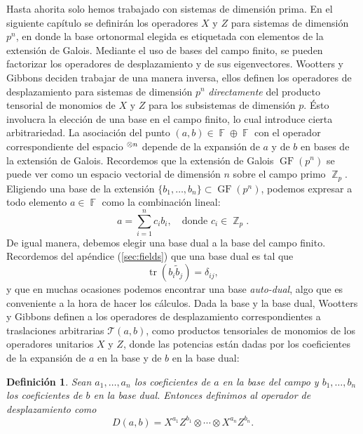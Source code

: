 \documentclass[a4paper]{report}
\DeclareMathOperator{\Z}{\mathbb{Z}}
\DeclareMathOperator{\F}{\mathbb{F}}
\let\H\relax
\DeclareMathOperator{\H}{\mathcal H}
\DeclareMathOperator{\tr}{tr}
\DeclareMathOperator{\GF}{GF}
\newtheorem{definition}{Definición}
\begin{document}
  Hasta ahorita solo hemos trabajado con sistemas de
  dimensión prima. En el siguiente capítulo se definirán los
  operadores $X$ y $Z$ para sistemas de dimensión $p^{n}$,
  en donde la base ortonormal elegida es etiquetada con
  elementos de la extensión de Galois. Mediante el uso de
  bases del campo finito, se pueden factorizar los
  operadores de desplazamiento y de sus eigenvectores.
  Wootters y Gibbons deciden trabajar de una manera inversa,
  ellos definen los operadores de desplazamiento para
  sistemas de dimensión $p^{n}$ \textit{directamente} del
  producto tensorial de monomios de $X$ y $Z$ para los
  subsistemas de dimensión $p$. Ésto involucra la elección
  de una base en el campo finito, lo cual introduce cierta
  arbitrariedad. La asociación del punto $(a,b) \in \F
  \oplus \F$ con el operador correspondiente del espacio
  $\H^{\otimes n}$ depende de la expansión de $a$ y de $b$
  en bases de la extensión de Galois.  Recordemos que la
  extensión de Galois $\GF\left(p^{n}\right)$ se puede ver
  como un espacio vectorial de dimensión $n$ sobre el campo
  primo $\Z_p$.  Eligiendo una base de la extensión
  $\{b_1,\ldots,b_n\} \subset \GF\left(p^{n}\right)$,
  podemos expresar a todo elemento $a \in \F$ como la
  combinación lineal:
  \[
    a = \sum_{i=1}^{n} c_i b_i,
    \quad
    \text{donde } c_i \in \Z_p.
  \] 
  De igual manera, debemos elegir una base dual a la base
  del campo finito. Recordemos del apéndice
  (\ref{sec:fields}) que una base dual es tal que
  \[
    \tr(b_i \tilde b_j) = \delta_{ij},
  \] 
  y que en muchas ocasiones podemos encontrar una base
  \textit{auto-dual}, algo que es conveniente a la hora de
  hacer los cálculos. Dada la base y la base dual, Wootters
  y Gibbons definen a los operadores de desplazamiento
  correspondientes a traslaciones arbitrarias $\mathcal
  T(a,b)$, como productos tensoriales de monomios de los
  operadores unitarios $X$ y $Z$, donde las potencias están
  dadas por los coeficientes de la expansión de $a$ en la
  base y de $b$ en la base dual:
  \begin{definition}
    Sean $a_1,\ldots,a_n$ los coeficientes de $a$ en la base
    del campo y $b_1,\ldots,b_n$ los coeficientes de $b$ en
    la base dual. Entonces definimos al operador de
    desplazamiento como
    \begin{equation}
      \label{eqn:wootters_hw_ops}
      D(a,b)
      = X^{a_1} Z^{b_1} \otimes \cdots \otimes X^{a_n}
      Z^{b_n}.
    \end{equation}
  \end{definition}
\end{document}
